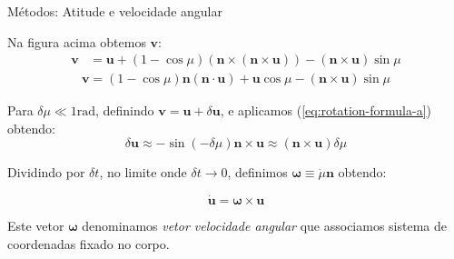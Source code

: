 \documentclass{beamer}
\begin{document}
\begin{frame}{Métodos: Atitude e velocidade angular}

Na figura acima obtemos \(\mathbf{v}\):
    \begin{align}
        \mathbf{v} &= \mathbf{u} + \left(1 - {\cos{\mu}}\right) \left(\mathbf{n}\!\times\!\left(\mathbf{n}\!\times\!\mathbf{u}\right)\right) - \left(\mathbf{n}\!\times\!\mathbf{u}\right){\sin{\mu}}\label{eq:rotation-formula-a} %
    \end{align}
    \begin{align}
        \mathbf{v} = \left(1 - {\cos{\mu}}\right) \mathbf{n}\!\left(\mathbf{n}\cdot\mathbf{u}\right) + \mathbf{u}{\cos{\mu}} - \left(\mathbf{n}\!\times\!\mathbf{u}\right){\sin{\mu}} \label{eq:rotation-formula-b}  %
    \end{align}

    Para \(\delta\mu \ll 1 \text{rad}\), definindo \(\mathbf{v} = \mathbf{u} + \delta \mathbf{u}\), e aplicamos (\ref{eq:rotation-formula-a}) obtendo:
\begin{equation*}
    \delta \mathbf{u} \approx -\!\sin(-\delta\mu)\mathbf{n}\!\times\!\mathbf{u} \approx (\mathbf{n}\!\times\!\mathbf{u})\delta\mu
\end{equation*}

Dividindo por \(\delta t\), no limite onde \(\delta t \rightarrow 0\), definimos \(\mathbf{\omega} \equiv \dot{\mu}\mathbf{n}\) obtendo:

\begin{equation}
    \dot{\mathbf{u}} = \mathbf{\omega}\!\times\!\mathbf{u}\label{eq:vector-derivative} %
\end{equation}

Este vetor \(\mathbf{\omega}\) denominamos \textit{vetor velocidade angular} que associamos sistema de coordenadas fixado no corpo.

\end{frame}
\end{document}
